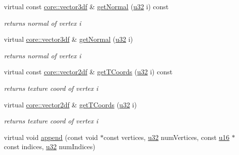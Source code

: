 \begin{DoxyCompactItemize}
virtual const \hyperlink{namespaceirr_1_1core_ae6e2b2a6c552833ebbd5b7463d03586b}{core\+::vector3df} \& \hyperlink{classirr_1_1scene_1_1CMeshBuffer_ac93c92c49e801141cab699484bcf818d}{get\+Normal} (\hyperlink{namespaceirr_a0416a53257075833e7002efd0a18e804}{u32} i) const
\begin{DoxyCompactList}\small\item\em returns normal of vertex i \end{DoxyCompactList}\item 
\mbox{\label{classirr_1_1scene_1_1CMeshBuffer_ad8515509517384dc31e9ad46eea323a0}} 
virtual \hyperlink{namespaceirr_1_1core_ae6e2b2a6c552833ebbd5b7463d03586b}{core\+::vector3df} \& \hyperlink{classirr_1_1scene_1_1CMeshBuffer_ad8515509517384dc31e9ad46eea323a0}{get\+Normal} (\hyperlink{namespaceirr_a0416a53257075833e7002efd0a18e804}{u32} i)
\begin{DoxyCompactList}\small\item\em returns normal of vertex i \end{DoxyCompactList}\item 
\mbox{\label{classirr_1_1scene_1_1CMeshBuffer_a2823a97a353b6909e66a18dca46a8f30}} 
virtual const \hyperlink{namespaceirr_1_1core_a116f90bd31515724b6235014ee2b74d5}{core\+::vector2df} \& \hyperlink{classirr_1_1scene_1_1CMeshBuffer_a2823a97a353b6909e66a18dca46a8f30}{get\+T\+Coords} (\hyperlink{namespaceirr_a0416a53257075833e7002efd0a18e804}{u32} i) const
\begin{DoxyCompactList}\small\item\em returns texture coord of vertex i \end{DoxyCompactList}\item 
\mbox{\label{classirr_1_1scene_1_1CMeshBuffer_a50e1a283111e3aa8325a7e774f08fb27}} 
virtual \hyperlink{namespaceirr_1_1core_a116f90bd31515724b6235014ee2b74d5}{core\+::vector2df} \& \hyperlink{classirr_1_1scene_1_1CMeshBuffer_a50e1a283111e3aa8325a7e774f08fb27}{get\+T\+Coords} (\hyperlink{namespaceirr_a0416a53257075833e7002efd0a18e804}{u32} i)
\begin{DoxyCompactList}\small\item\em returns texture coord of vertex i \end{DoxyCompactList}\item 
virtual void \hyperlink{classirr_1_1scene_1_1CMeshBuffer_a7efd85cba5d5d86bee8c2ea2fe0524d9}{append} (const void $\ast$const vertices, \hyperlink{namespaceirr_a0416a53257075833e7002efd0a18e804}{u32} num\+Vertices, const \hyperlink{namespaceirr_ae9f8ec82692ad3b83c21f555bfa70bcc}{u16} $\ast$const indices, \hyperlink{namespaceirr_a0416a53257075833e7002efd0a18e804}{u32} num\+Indices)

\end{DoxyCompactItemize}
